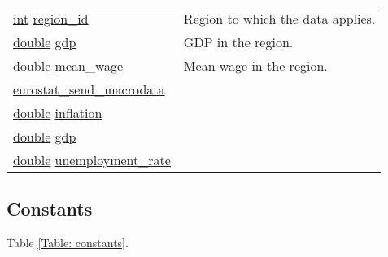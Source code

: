 \documentclass[a4paper,11pt]{article}
\begin{document}
\begin{center}
\begin{longtable}[H!]{ll}
\midrule
\url{int} \url{region_id} & \parbox{10cm}{Region to which the data applies.}\\
\url{double} \url{gdp} & \parbox{10cm}{GDP in the region.}\\
\url{double} \url{mean_wage} & \parbox{10cm}{Mean wage in the region.}\\
\midrule
\url{eurostat_send_macrodata} & \parbox{10cm}{}\\
\midrule
\url{double} \url{inflation} & \parbox{10cm}{}\\
\url{double} \url{gdp} & \parbox{10cm}{}\\
\url{double} \url{unemployment_rate} & \parbox{10cm}{}\\
\end{longtable}
\end{center}
\subsection{Constants}
Table \ref{Table: constants}.
\end{document}
